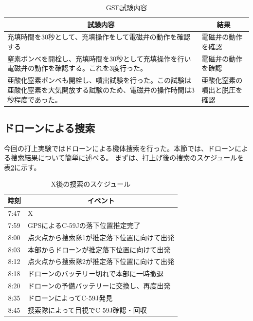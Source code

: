 \documentclass[a4paper,11pt,uplatex]{jsarticle}
\begin{document}
\begin{table}[H]
	\centering
	\caption{GSE試験内容}
	\begin{tabular}{p{90mm}l} \toprule
		\multicolumn{1}{c}{試験内容}                                        & \multicolumn{1}{c}{結果} \\  \midrule
		充填時間を30秒として、充填操作をして電磁弁の動作を確認する                                  & 電磁弁の動作を確認              \\ \midrule
		窒素ボンベを開栓し、充填時間を30秒として充填操作を行い電磁弁の動作を確認する。これを3度行った。               & 電磁弁の動作を確認              \\ \midrule
		亜酸化窒素ボンベも開栓し、噴出試験を行った。この試験は亜酸化窒素を大気開放する試験のため、電磁弁の操作時間は3秒程度であった。 & 亜酸化窒素の噴出と脱圧を確認         \\
		\bottomrule
	\end{tabular}
	\label{gse_mokuteki}
\end{table}

\subsection{ドローンによる捜索}
今回の打上実験ではドローンによる機体捜索を行った。本節では、ドローンによる捜索結果について簡単に述べる。
まずは、打上げ後の捜索のスケジュールを表\ref{tab:find}に示す。

\begin{table}[H]
	\centering
	\caption{X後の捜索のスケジュール}
	\begin{tabular}{cl} \toprule
		時刻   & \multicolumn{1}{c}{イベント} \\ \midrule
		7:47 & X                        \\
		7:59 & GPSによるC-59Jの落下位置推定完了     \\
		8:00 & 点火点から捜索隊1が推定落下位置に向けて出発   \\
		8:03 & 本部からドローンが推定落下位置に向けて出発    \\
		8:12 & 点火点から捜索隊2が推定落下位置に向けて出発   \\
		8:18 & ドローンのバッテリー切れで本部に一時撤退     \\
		8:20 & ドローンの予備バッテリーに交換し、再度出発    \\
		8:35 & ドローンによってC-59J発見          \\
		8:45 & 捜索隊によって目視でC-59J確認・回収     \\
		\bottomrule
	\end{tabular}
	\label{tab:find}
\end{table}
\end{document}
